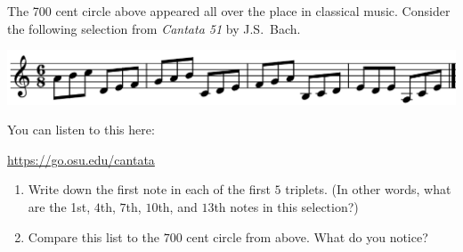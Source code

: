 \documentclass[12pt,noauthor,nooutcomes, handout]{ximera}
\begin{document}
\begin{question}
The 700 cent circle above appeared all over the place in classical music.
Consider the following selection from \emph{Cantata 51} by J.S.\ Bach.


\centerline{\includegraphics[width=.9\textwidth]{generators/Bach.png}}

You can listen to this here:

\begin{center}
\url{https://go.osu.edu/cantata}
\end{center}

\begin{enumerate}
    \item Write down the first note in each of the first $5$ triplets. (In other words, what are the 1st, $4$th, $7$th, $10$th, and $13$th notes in this selection?)

\answerspace

\answerspace

    \item Compare this list to the $700$ cent circle from above. What do you notice?
\end{enumerate}
\end{question}
\end{document}
